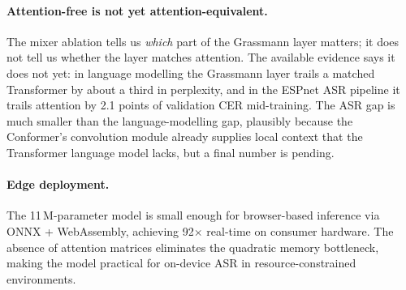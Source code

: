 \documentclass[11pt,a4paper]{article}
\begin{document}
\paragraph{Attention-free is not yet attention-equivalent.}
The mixer ablation tells us \emph{which} part of the Grassmann layer
matters; it does not tell us whether the layer matches attention.  The
available evidence says it does not yet: in language modelling the
Grassmann layer trails a matched Transformer by about a third in
perplexity, and in the ESPnet ASR pipeline it trails attention by
2.1 points of validation CER mid-training.  The ASR gap is much
smaller than the language-modelling gap, plausibly because the
Conformer's convolution module already supplies local context that
the Transformer language model lacks, but a final number is pending.

\paragraph{Edge deployment.}
The 11\,M-parameter model is small enough for browser-based inference
via ONNX + WebAssembly, achieving 92$\times$ real-time on consumer
hardware.  The absence of attention matrices eliminates the quadratic
memory bottleneck, making the model practical for on-device ASR in
resource-constrained environments.
\end{document}
